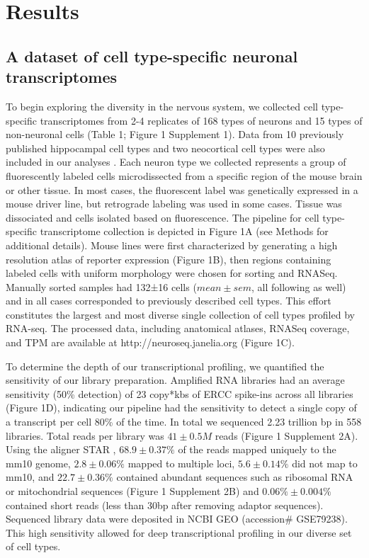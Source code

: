 \section{Results}

\subsection{A dataset of cell type-specific neuronal transcriptomes}
To begin exploring the diversity in the nervous system, we collected cell type-specific transcriptomes from 2-4 replicates of 168 types of neurons and 15 types of non-neuronal cells (Table 1; Figure 1 Supplement 1). Data from 10 previously published hippocampal cell types \cite{Cembrowski_2016} and two neocortical cell types \cite{Shima_2016} were also included in our analyses . Each neuron type we collected represents a group of fluorescently labeled cells microdissected from a specific region of the mouse brain or other tissue. In most cases, the fluorescent label was genetically expressed in a mouse driver line, but retrograde labeling was used in some cases. Tissue was dissociated and cells isolated based on fluorescence. The pipeline for cell type-specific transcriptome collection is depicted in Figure 1A (see Methods for additional details). Mouse lines were first characterized by generating a high resolution atlas of reporter expression (Figure 1B), then regions containing labeled cells with uniform morphology were chosen for sorting and RNASeq. Manually sorted samples had 132±16 cells ($mean\pm sem$, all following as well) and in all cases corresponded to previously described cell types. This effort constitutes the largest and most diverse single collection of cell types profiled by RNA-seq. The processed data, including anatomical atlases, RNASeq coverage, and TPM are available at http://neuroseq.janelia.org (Figure 1C). 

To determine the depth of our transcriptional profiling, we quantified the sensitivity of our library preparation. Amplified RNA libraries had an average sensitivity (50\% detection) of 23 copy*kbs of ERCC spike-ins across all libraries (Figure 1D), indicating our pipeline had the sensitivity to detect a single copy of a transcript per cell 80\% of the time. In total we sequenced 2.23 trillion bp in 558 libraries. Total reads per library was $41\pm0.5M$ reads (Figure 1 Supplement 2A). Using the aligner STAR \cite{Dobin_2012}, $68.9\pm0.37\%$ of the reads mapped uniquely to the mm10 genome, $2.8\pm0.06\%$ mapped to multiple loci, $5.6\pm0.14\%$ did not map to mm10, and $22.7\pm0.36\%$ contained abundant sequences such as ribosomal RNA or mitochondrial sequences (Figure 1 Supplement 2B) and $0.06\%\pm 0.004\%$ contained short reads (less than 30bp after removing adaptor sequences). Sequenced library data were deposited in NCBI GEO (accession\# GSE79238). This high sensitivity allowed for deep transcriptional profiling in our diverse set of cell types.

